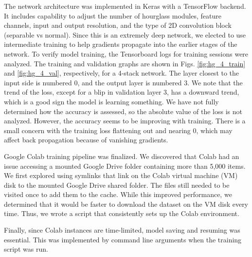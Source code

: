 \documentclass[11pt, letterpaper]{article}
\begin{document}
The network architecture was implemented in Keras with a TensorFlow backend. It includes capability to adjust the number of hourglass modules, feature channels, input and output resolution, and the type of 2D convolution block (separable vs normal). Since this is an extremely deep network, we elected to use intermediate training to help gradients propagate into the earlier stages of the network. To verify model training, the Tensorboard logs for training sessions were analyzed. The training and validation graphs are shown in Figs. \ref{fig:hg_4_train} and \ref{fig:hg_4_val}, respectively, for a 4-stack network. The layer closest to the input side is numbered 0, and the output layer is numbered 3. We note that the trend of the loss, except for a blip in validation layer 3, has a downward trend, which is a good sign the model is learning something. We have not fully determined how the accuracy is assessed, so the absolute value of the loss is not analyzed. However, the accuracy seems to be improving with training. There is a small concern with the training loss flattening out and nearing 0, which may affect back propagation because of vanishing gradients. 

Google Colab training pipeline was finalized. We discovered that Colab had an issue accessing a mounted Google Drive folder containing more than 5,000 items. We first explored using symlinks that link on the Colab virtual machine (VM) disk to the mounted Google Drive shared folder. The files still needed to be visited once to add them to the cache. While this improved performance, we determined that it would be faster to download the dataset on the VM disk every time. Thus, we wrote a script that consistently sets up the Colab environment.

Finally, since Colab instances are time-limited, model saving and resuming was essential. This was implemented by command line arguments when the training script was run.





\end{document}
